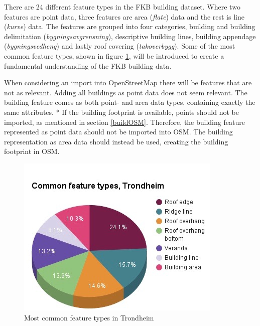 There are 24 different feature types in the FKB building dataset. Where two features are point data, three features are area  (\textit{flate}) data and the rest is line (\textit{kurve}) data.  The features are grouped into four categories, building and building delimitation (\textit{bygningsavgrensning}), descriptive building lines, building appendage (\textit{bygningsvedheng}) and lastly roof covering (\textit{takoverbygg}). Some of the most common feature types, shown in figure \ref{fig:commfeattypes}, will be introduced to create a fundamental understanding of the FKB building data.

When considering an import into OpenStreetMap there will be features that are not as relevant. Adding all buildings as point data does not seem relevant. The building feature comes as both point- and area data types, containing exactly the same attributes. * %
If the building footprint is available, points should not be imported, as mentioned in section \ref{buildOSM}. Therefore, the building feature represented as point data should not be imported into OSM. The building representation as area data should instead be used, creating the building footprint in OSM. 

\begin{figure}[H]
    \centering
    \includegraphics[scale=0.6]{figures/FixedByMe/comm_feature_type.jpg}
    \caption{Most common feature types in Trondheim}
    \label{fig:commfeattypes}
\end{figure} 

